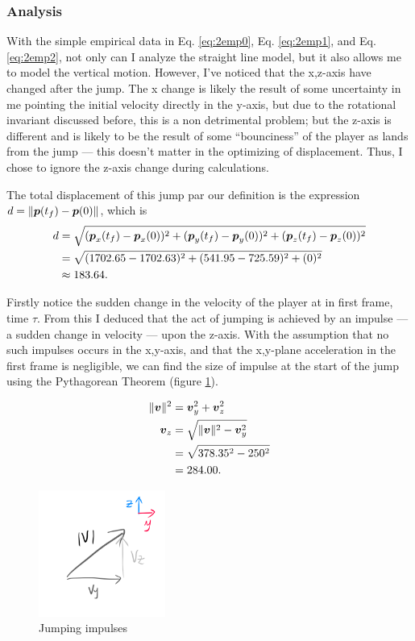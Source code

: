 \subsubsection{Analysis}
With the simple empirical data in Eq. \ref{eq:2emp0}, Eq. \ref{eq:2emp1}, and Eq. \ref{eq:2emp2}, not only can I analyze the straight line model, but it also allows me to model the vertical motion. However, I've noticed that the x,z-axis have changed after the jump. The x change is likely the result of some uncertainty in me pointing the initial velocity directly in the y-axis, but due to the rotational invariant discussed before, this is a non detrimental problem; but the z-axis is different and is likely to be the result of some ``bounciness'' of the player as lands from the jump --- this doesn't matter in the optimizing of displacement. Thus, I chose to ignore the z-axis change during calculations.

The total displacement of this jump par our definition is the expression $d = \|\boldsymbol{p}(t_f) - \boldsymbol{p}(0)\|$, which is
\begin{align*}
    d &= \sqrt{(\boldsymbol{p}_x(t_f) - \boldsymbol{p}_x(0))^2 + (\boldsymbol{p}_y(t_f) - \boldsymbol{p}_y(0))^2 + (\boldsymbol{p}_z(t_f) - \boldsymbol{p}_z(0))^2}\\
    &= \sqrt{(1702.65-1702.63)^2 + (541.95-725.59)^2 + (0)^2}\\
    &\approx 183.64.
\end{align*}

Firstly notice the sudden change in the velocity of the player at in first frame, time $\tau$. From this I deduced that the act of jumping is achieved by an impulse --- a sudden change in velocity --- upon the z-axis. With the assumption that no such impulses occurs in the x,y-axis, and that the x,y-plane acceleration in the first frame is negligible, we can find the size of impulse at the start of the jump using the Pythagorean Theorem (figure \ref{fig:2verticalimpulse}).



\begin{align*}
    \|\boldsymbol{v}\|^2 &= \boldsymbol{v}_y^2 + \boldsymbol{v}_z^2\\
    \boldsymbol{v}_z &= \sqrt{\|\boldsymbol{v}\|^2 - \boldsymbol{v}_y^2}\\
    &= \sqrt{378.35^2 -250^2}\\
    &= 284.00.
\end{align*}

\begin{figure}
    \centering
    \includegraphics[width=0.37\textwidth,right]{assets/2verticalimpulse.png}
    \caption{\vspace{8ex} Jumping impulses}
    \label{fig:2verticalimpulse}
\end{figure}

